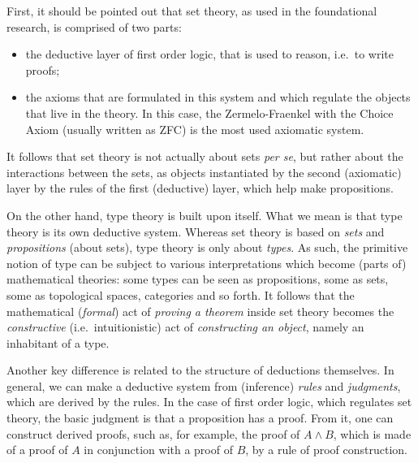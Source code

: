 First, it should be pointed out that set theory, as used in the foundational
research, is comprised of two parts:
\begin{itemize}
\item the deductive layer of first order logic, that is used to reason, i.e.\
  to write proofs;
\item the axioms that are formulated in this system and which regulate
  the objects that live in the theory. In this case, the Zermelo-Fraenkel
  with the Choice Axiom (usually written as ZFC) is the most used
  axiomatic system.
\end{itemize}
It follows that set theory is not actually about sets \emph{per se}, but
rather about the interactions between the sets, as objects instantiated
by the second (axiomatic) layer by the rules of the first (deductive) layer,
which help make propositions.

On the other hand, type theory is built upon itself. What we
mean is that type theory is its own deductive system. Whereas set theory
is based on \emph{sets} and \emph{propositions} (about sets), type theory
is only about \emph{types}. As such, the primitive notion of type can be
subject to various interpretations which become (parts of) mathematical
theories: some types can be seen as propositions, some as sets, some as
topological spaces, categories and so forth. It follows that the mathematical
(\emph{formal}) act of \emph{proving a theorem} inside set theory becomes the
\emph{constructive} (i.e.\ intuitionistic) act of \emph{constructing an object},
namely an inhabitant of a type.

Another key difference is related to the structure of deductions themselves.
In general, we can make a deductive system from (inference) \emph{rules}
and \emph{judgments}, which are derived by the rules. In the case of
first order logic, which regulates set theory, the basic judgment is
that a proposition has a proof. From it, one can construct derived proofs,
such as, for example, the proof of $ A \land B $, which is made of a proof
of $ A $ in conjunction with a proof of $ B $, by a rule of proof construction.

